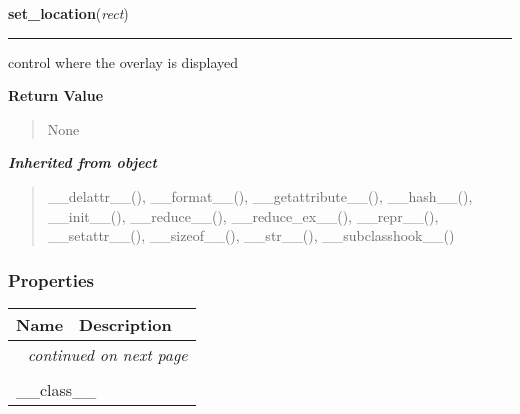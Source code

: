 \hspace{.8\funcindent}\begin{boxedminipage}{\funcwidth}

    \raggedright \textbf{set\_location}(\textit{rect})

    \vspace{-1.5ex}

    \rule{\textwidth}{0.5\fboxrule}
\setlength{\parskip}{2ex}
    control where the overlay is displayed

\setlength{\parskip}{1ex}
      \textbf{Return Value}
    \vspace{-1ex}

      \begin{quote}
      None

      \end{quote}

    \end{boxedminipage}


\large{\textbf{\textit{Inherited from object}}}

\begin{quote}
\_\_delattr\_\_(), \_\_format\_\_(), \_\_getattribute\_\_(), \_\_hash\_\_(), \_\_init\_\_(), \_\_reduce\_\_(), \_\_reduce\_ex\_\_(), \_\_repr\_\_(), \_\_setattr\_\_(), \_\_sizeof\_\_(), \_\_str\_\_(), \_\_subclasshook\_\_()
\end{quote}


  \subsubsection{Properties}

    \vspace{-1cm}
\hspace{\varindent}\begin{longtable}{|p{\varnamewidth}|p{\vardescrwidth}|l}
\cline{1-2}
\cline{1-2} \centering \textbf{Name} & \centering \textbf{Description}& \\
\cline{1-2}
\endhead\cline{1-2}\multicolumn{3}{r}{\small\textit{continued on next page}}\\\endfoot\cline{1-2}
\endlastfoot\multicolumn{2}{|l|}{\textit{Inherited from object}}\\
\multicolumn{2}{|p{\varwidth}|}{\raggedright \_\_class\_\_}\\
\cline{1-2}
\end{longtable}

